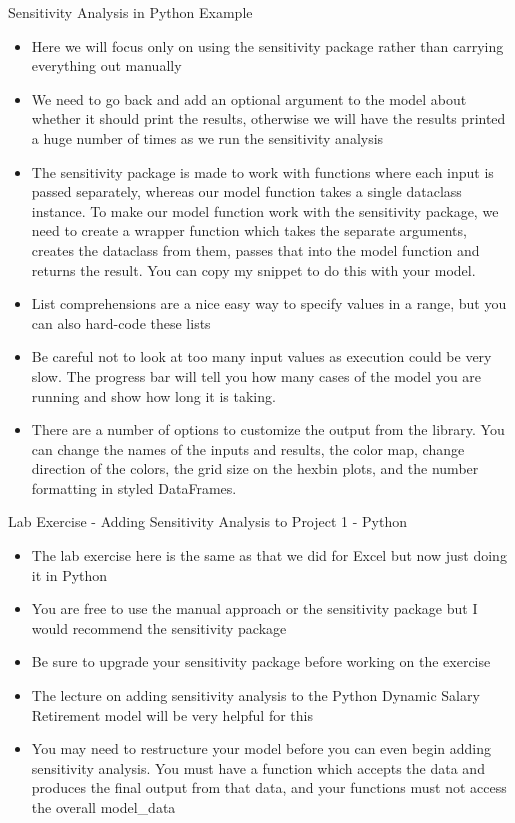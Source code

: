 \documentclass[]{article}
\begin{document}
\begin{section}{Sensitivity Analysis in Python Example}
\begin{itemize}
\item Here we will focus only on using the sensitivity package rather than carrying everything out manually
\item We need to go back and add an optional argument to the model about whether it should print the results, otherwise we will have the results printed a huge number of times as we run the sensitivity analysis
\item The sensitivity package is made to work with functions where each input is passed separately, whereas our model function takes a single dataclass instance. To make our model function work with the sensitivity package, we need to create a wrapper function which takes the separate arguments, creates the dataclass from them, passes that into the model function and returns the result. You can copy my snippet to do this with your model.
\item List comprehensions are a nice easy way to specify values in a range, but you can also hard-code these lists
\item Be careful not to look at too many input values as execution could be very slow. The progress bar will tell you how many cases of the model you are running and show how long it is taking.
\item There are a number of options to customize the output from the library. You can change the names of the inputs and results, the color map, change direction of the colors, the grid size on the hexbin plots, and the number formatting in styled DataFrames.
\end{itemize}
\end{section}
\begin{section}{Lab Exercise - Adding Sensitivity Analysis to Project 1 - Python}
\begin{itemize}
\item The lab exercise here is the same as that we did for Excel but now just doing it in Python
\item You are free to use the manual approach or the sensitivity package but I would recommend the sensitivity package
\item Be sure to upgrade your sensitivity package before working on the exercise
\item The lecture on adding sensitivity analysis to the Python Dynamic Salary Retirement model will be very helpful for this
\item You may need to restructure your model before you can even begin adding sensitivity analysis. You must have a function which accepts the data and produces the final output from that data, and your functions must not access the overall model\_data
\end{itemize}
\end{section}
\end{document}
